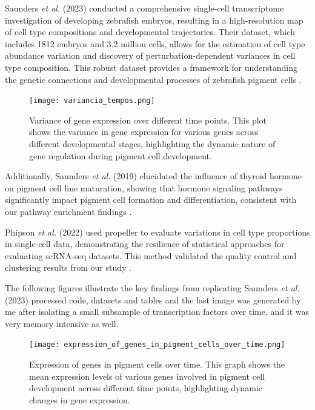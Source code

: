 \documentclass[runningheads]{llncs}
\begin{document}
Saunders \textit{et al.} (2023) conducted a comprehensive single-cell transcriptome investigation of developing zebrafish embryos, resulting in a high-resolution map of cell type compositions and developmental trajectories. Their dataset, which includes 1812 embryos and 3.2 million cells, allows for the estimation of cell type abundance variation and discovery of perturbation-dependent variances in cell type composition. This robust dataset provides a framework for understanding the genetic connections and developmental processes of zebrafish pigment cells \cite{saunders2023embryo}.

\begin{figure}[H]
  \centering
  \texttt{[image: variancia\_tempos.png]}
  \caption{Variance of gene expression over different time points. This plot shows the variance in gene expression for various genes across different developmental stages, highlighting the dynamic nature of gene regulation during pigment cell development.}
  \label{results 2}
\end{figure}

Additionally, Saunders \textit{et al.} (2019) elucidated the influence of thyroid hormone on pigment cell line maturation, showing that hormone signaling pathways significantly impact pigment cell formation and differentiation, consistent with our pathway enrichment findings \cite{saunders2019thyroid}.

Phipson \textit{et al.} (2022) used propeller to evaluate variations in cell type proportions in single-cell data, demonstrating the resilience of statistical approaches for evaluating scRNA-seq datasets. This method validated the quality control and clustering results from our study \cite{phipson2022propeller}.

The following figures illustrate the key findings from replicating Saunders \textit{et al.} (2023) processed code, datasets and tables and the last image was generated by me after isolating a small subsample of transcription factors over time, and it was very memory intensive as well.

\begin{figure}[H]
  \centering
  \texttt{[image: expression\_of\_genes\_in\_pigment\_cells\_over\_time.png]}
  \caption{Expression of genes in pigment cells over time. This graph shows the mean expression levels of various genes involved in pigment cell development across different time points, highlighting dynamic changes in gene expression.}
  \label{results 3}
\end{figure}
\end{document}
